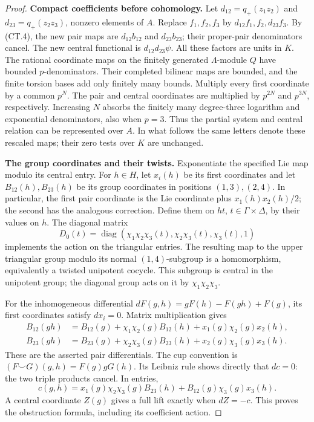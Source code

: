 \begin{proof}
\par\medskip\noindent\textbf{Compact coefficients before cohomology.}
Let \(d_{12}=q_+(z_1z_2)\) and \(d_{23}=q_+(z_2z_3)\), nonzero
elements of \(A\). Replace \(f_1,f_2,f_3\) by
\(d_{12}f_1,f_2,d_{23}f_3\). By (CT.4), the new pair maps are
\(d_{12}b_{12}\) and \(d_{23}b_{23}\); their proper-pair
denominators cancel. The new central functional is
\(d_{12}d_{23}\psi\). All these factors are units in \(K\).
The rational coordinate maps on the finitely generated
\(\Lambda\)-module \(Q\) have bounded \(p\)-denominators.
Their completed bilinear maps are bounded, and the finite torsion
bases add only finitely many bounds. Multiply every first coordinate
by a common \(p^N\). The pair and central coordinates are multiplied
by \(p^{2N}\) and \(p^{3N}\), respectively. Increasing \(N\)
absorbs the finitely many degree-three logarithm and exponential
denominators, also when \(p=3\). Thus the partial system and central
relation can be represented over \(A\). In what follows the same
letters denote these rescaled maps; their zero tests over \(K\)
are unchanged.

\par\medskip\noindent\textbf{The group coordinates and their twists.}
Exponentiate the specified Lie map modulo its central entry. For
\(h\in H\), let \(x_i(h)\) be its first coordinates and let
\(B_{12}(h),B_{23}(h)\) be its group coordinates in positions
\((1,3),(2,4)\). In particular, the first pair coordinate is the
Lie coordinate plus \(x_1(h)x_2(h)/2\); the second has the
analogous correction. Define them on \(h t\),
\(t\in\Gamma\times\Delta\), by their values on \(h\).
The diagonal matrix
\[
 D_0(t)=\operatorname{diag}
   (\chi_1\chi_2\chi_3(t),\chi_2\chi_3(t),\chi_3(t),1)
\]
implements the action on the triangular entries. The resulting
map to the upper triangular group modulo its normal
\((1,4)\)-subgroup is a homomorphism, equivalently a twisted
unipotent cocycle. This subgroup is central in the unipotent
group; the diagonal group acts on it by
\(\chi_1\chi_2\chi_3\).

For the inhomogeneous differential
\(dF(g,h)=gF(h)-F(gh)+F(g)\), its first coordinates satisfy
\(dx_i=0\). Matrix multiplication gives
\[
 \begin{split}
 B_{12}(gh)&=B_{12}(g)+\chi_1\chi_2(g)B_{12}(h)
                      +x_1(g)\chi_2(g)x_2(h),\\
 B_{23}(gh)&=B_{23}(g)+\chi_2\chi_3(g)B_{23}(h)
                      +x_2(g)\chi_3(g)x_3(h).
 \end{split}
 \tag{CT.11}
\]
These are the asserted pair differentials. The cup convention is
\((F\smile G)(g,h)=F(g)gG(h)\). Its Leibniz rule shows directly
that \(dc=0\): the two triple products cancel. In entries,
\[
 c(g,h)=x_1(g)\chi_2\chi_3(g)B_{23}(h)
              +B_{12}(g)\chi_3(g)x_3(h).
 \tag{CT.12}
\]
A central coordinate \(Z(g)\) gives a full lift exactly when
\(dZ=-c\). This proves the obstruction formula, including its
coefficient action.


\end{proof}
